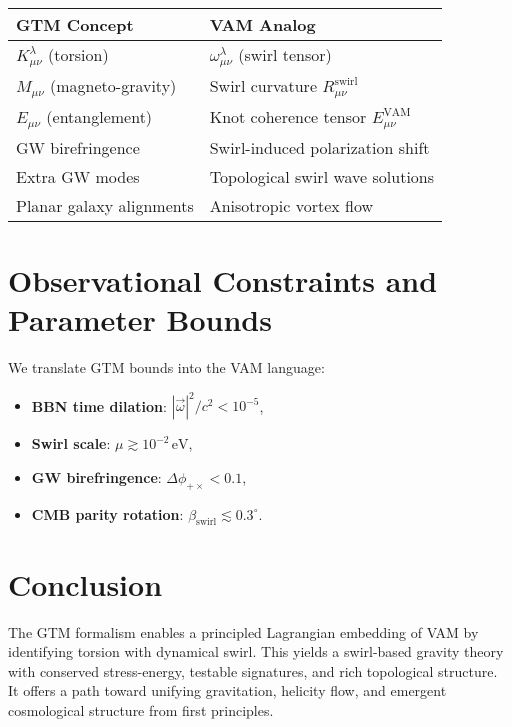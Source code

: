 \documentclass[12pt]{article}
\begin{document}
        \begin{center}
            \begin{tabular}{|l|l|}
                \hline
                \textbf{GTM Concept} & \textbf{VAM Analog} \\
                \hline
                \( K^\lambda_{\mu\nu} \) (torsion) & \( \omega^\lambda_{\mu\nu} \) (swirl tensor) \\
                \( M_{\mu\nu} \) (magneto-gravity) & Swirl curvature \( R^\text{swirl}_{\mu\nu} \) \\
                \( E_{\mu\nu} \) (entanglement) & Knot coherence tensor \( E_{\mu\nu}^{\text{VAM}} \) \\
                GW birefringence & Swirl-induced polarization shift \\
                Extra GW modes & Topological swirl wave solutions \\
                Planar galaxy alignments & Anisotropic vortex flow \\
                \hline
            \end{tabular}
        \end{center}

        \section{Observational Constraints and Parameter Bounds}

        We translate GTM bounds into the VAM language:
        \begin{itemize}
            \item \textbf{BBN time dilation}: \( |\vec{\omega}|^2 / c^2 < 10^{-5} \),
            \item \textbf{Swirl scale}: \( \mu \gtrsim 10^{-2} \,\text{eV} \),
            \item \textbf{GW birefringence}: \( \Delta\phi_{+\times} < 0.1 \),
            \item \textbf{CMB parity rotation}: \( \beta_\text{swirl} \lesssim 0.3^\circ \).
        \end{itemize}

        \section{Conclusion}

        The GTM formalism enables a principled Lagrangian embedding of VAM by identifying torsion with dynamical swirl. This yields a swirl-based gravity theory with conserved stress-energy, testable signatures, and rich topological structure. It offers a path toward unifying gravitation, helicity flow, and emergent cosmological structure from first principles.
\end{document}
